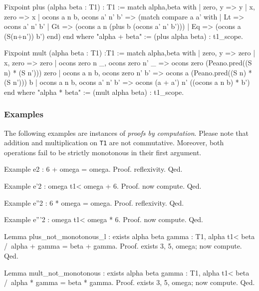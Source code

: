 \label{sect:infix-plus-T1}

\begin{Coqsrc}
Fixpoint plus (alpha beta : T1) : T1 :=
  match alpha,beta with
 |  zero, y  => y
 |  x, zero  => x
 |  ocons a n b, ocons a' n' b' =>
    (match compare a a' with
     | Lt => ocons a' n' b'
     | Gt => (ocons a n (plus b (ocons a' n' b')))
     | Eq  => (ocons a (S(n+n')) b')
     end)
  end
where "alpha + beta" := (plus alpha beta) : t1_scope.
\end{Coqsrc}

\begin{Coqsrc}
Fixpoint mult (alpha beta : T1) :T1 :=
  match alpha,beta with
 |  zero, y  => zero
 |  x, zero => zero
 |  ocons zero n _, ocons zero n' _ => 
                 ocons zero (Peano.pred((S n) * (S n'))) zero
 |  ocons a n b, ocons zero n' b' =>  
                 ocons a (Peano.pred((S n) * (S n'))) b
 |  ocons a n b, ocons a' n' b' =>
     ocons (a + a') n' ((ocons a n b) * b')
 end
where  "alpha * beta" := (mult alpha beta) : t1_scope.
\end{Coqsrc}


\subsubsection{Examples}

The following examples are instances of \emph{proofs by computation}. Please note that  addition and multiplication on \texttt{T1}
are not commutative. Moreover,  both operations fail to be strictly monotonous in their first argument.


\begin{Coqsrc}
Example e2 : 6 + omega = omega.
Proof. reflexivity. Qed.

Example e'2 : omega t1< omega + 6.
Proof. now compute. Qed.

Example e''2 : 6 * omega = omega.
Proof. reflexivity. Qed.

Example e'''2 : omega t1< omega * 6.
Proof. now compute. Qed.
\end{Coqsrc}

\begin{Coqsrc}
Lemma plus_not_monotonous_l : exists alpha beta gamma : T1,
    alpha t1< beta /\ alpha + gamma = beta + gamma.
Proof.
  exists 3, 5, omega;  now  compute.
Qed.

Lemma mult_not_monotonous :  exists alpha beta gamma : T1,
      alpha t1< beta /\ alpha * gamma = beta * gamma.
Proof.
  exists 3, 5, omega; now compute.
Qed.
\end{Coqsrc}


